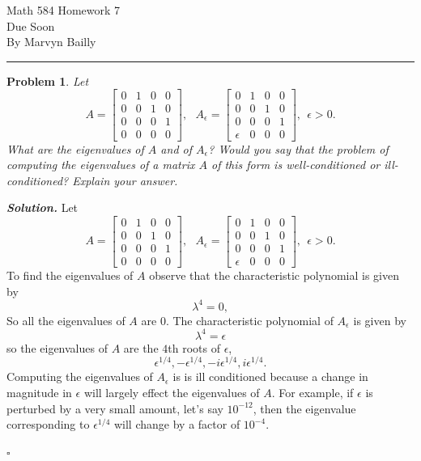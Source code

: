\documentclass[12pt]{report}
\newtheorem{problem}{Problem}
\newenvironment{solution}[1][\it{Solution}]{\textbf{#1. } }{$\square$}
\def\eps{{\epsilon}}
\begin{document}
\large

\begin{center}
 Math 584 Homework 7\\
 Due Soon\\
 By Marvyn Bailly\\
\end{center}

\normalsize

\hrule



\begin{problem}
    Let
    \[
    A = \left[ \begin{array}{cccc} 0 & 1 & 0 & 0 \\ 0 & 0 & 1 & 0 \\ 0 & 0 & 0 & 1 \\
    0 & 0 & 0 & 0 \end{array} \right] ,~~~
    A_{\epsilon} = \left[ \begin{array}{cccc} 0 & 1 & 0 & 0 \\ 0 & 0 & 1 & 0 \\
    0 & 0 & 0 & 1 \\ \epsilon & 0 & 0 & 0 \end{array} \right] ,~~\epsilon > 0.
    \]
    What are the eigenvalues of $A$ and of $A_{\epsilon}$?  Would you say that the problem of
    computing the eigenvalues of a matrix $A$ of this form is well-conditioned or ill-conditioned?
    Explain your answer.
\end{problem}

\begin{solution}
    \noindent
    Let
    \[
    A = \left[ \begin{array}{cccc} 0 & 1 & 0 & 0 \\ 0 & 0 & 1 & 0 \\ 0 & 0 & 0 & 1 \\
    0 & 0 & 0 & 0 \end{array} \right] ,~~~
    A_{\epsilon} = \left[ \begin{array}{cccc} 0 & 1 & 0 & 0 \\ 0 & 0 & 1 & 0 \\
    0 & 0 & 0 & 1 \\ \epsilon & 0 & 0 & 0 \end{array} \right] ,~~\epsilon > 0.
    \]
    To find the eigenvalues of $A$ observe that the characteristic polynomial is given by 
    \[ 
        \lambda^4 = 0,
    \]
    So all the eigenvalues of $A$ are $0$. The characteristic polynomial of $A_\eps$ is given by
    \[ 
        \lambda^4 = \epsilon
    \]
    so the eigenvalues of $A$ are the $4$th roots of $\epsilon$,
    \[ 
        \eps^{1/4}, -\eps^{1/4}, -i\eps^{1/4}, i\eps^{1/4}.
    \]
    Computing the eigenvalues of $A_\eps$ is is ill conditioned because a change in magnitude in $\eps$ will largely effect the eigenvalues of $A$. For example, if $\eps$ is perturbed by a very small amount, let's say $10^{-12}$, then the eigenvalue corresponding to $\eps^{1/4}$ will change by a factor of $10^{-4}$.



\end{solution}
\end{document}
